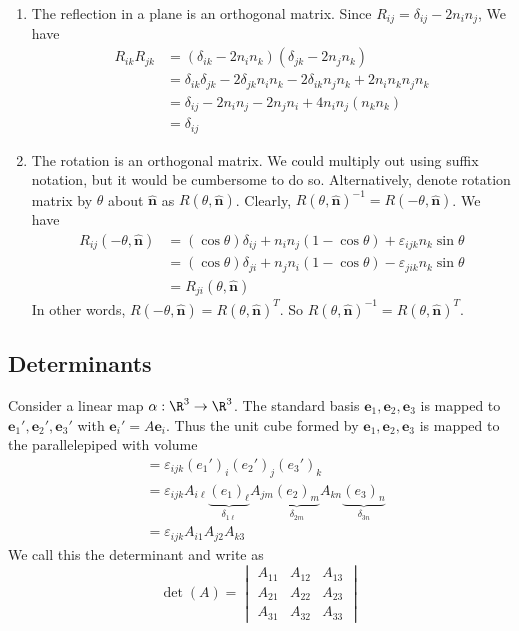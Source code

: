 \documentclass[a4paper]{article}
\begin{document}
\begin{eg}\leavevmode
  \begin{enumerate}
    \item The reflection in a plane is an orthogonal matrix. Since $R_{ij} = \delta_{ij} - 2n_in_j$, We have
      \begin{align*}
        R_{ik}R_{jk} &= (\delta_{ik} - 2n_in_k)(\delta_{jk} - 2n_jn_k)\\
        &= \delta_{ik}\delta_{jk} - 2\delta_{jk}n_in_k - 2\delta_{ik}n_jn_k + 2n_in_kn_jn_k\\
        &= \delta_{ij} - 2n_in_j - 2n_jn_i + 4n_in_j(n_kn_k)\\
        &= \delta_{ij}
      \end{align*}
    \item The rotation is an orthogonal matrix. We could multiply out using suffix notation, but it would be cumbersome to do so. Alternatively, denote rotation matrix by $\theta$ about $\mathbf{\hat n}$ as $R(\theta, \mathbf{\hat n})$. Clearly, $R(\theta, \mathbf{\hat n})^{-1} = R(-\theta, \mathbf{\hat n})$. We have
      \begin{align*}
        R_{ij}(-\theta, \mathbf{\hat n}) &= (\cos\theta)\delta_{ij} + n_in_j(1 - \cos\theta) + \varepsilon_{ijk}n_k\sin\theta\\
        &= (\cos\theta)\delta_{ji} + n_jn_i(1 - \cos\theta) - \varepsilon_{jik}n_k\sin\theta\\
        &= R_{ji}(\theta, \mathbf{\hat n})
      \end{align*}
      In other words, $R(-\theta, \mathbf{\hat n}) = R(\theta, \mathbf{\hat n})^T$. So $R(\theta, \mathbf{\hat n})^{-1} = R(\theta, \mathbf{\hat n})^T$.
  \end{enumerate}
\end{eg}

\subsection{Determinants}
Consider a linear map $\alpha: \R^3\to \R^3$. The standard basis $\mathbf{e}_1, \mathbf{e}_2, \mathbf{e}_3$ is mapped to $\mathbf{e}_1', \mathbf{e}_2', \mathbf{e}_3'$ with $\mathbf{e}_i' = A\mathbf{e}_i$. Thus the unit cube formed by $\mathbf{e}_1, \mathbf{e}_2, \mathbf{e}_3$ is mapped to the parallelepiped with volume
\begin{align*}
  [\mathbf{e}_1', \mathbf{e}_2', \mathbf{e}_3'] &= \varepsilon_{ijk}(e_1')_i (e_2')_j (e_3')_k\\
  &= \varepsilon_{ijk} A_{i\ell} \underbrace{(e_1)_\ell}_{\delta_{1\ell}} A_{jm}\underbrace{(e_2)_m}_{\delta_{2m}} A_{kn}\underbrace{(e_3)_n}_{\delta_{3n}}\\
  &= \varepsilon_{ijk} A_{i1}A_{j2}A_{k3}
\end{align*}
We call this the determinant and write as
\[
  \det(A) = \begin{vmatrix} A_{11} & A_{12} & A_{13}\\A_{21} & A_{22} & A_{23} \\ A_{31} & A_{32} & A_{33}\end{vmatrix}
\]
\end{document}
